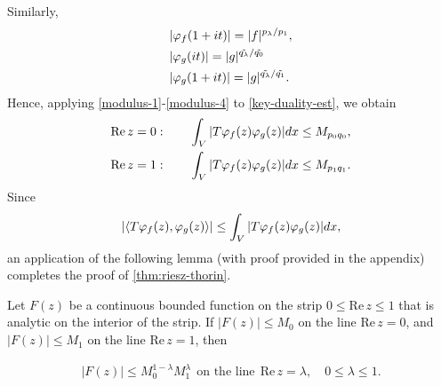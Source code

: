 %
%
Similarly,
%
%
\begin{align}
	\label{modulus-2}
	& | \varphi_f(1 + it) | = | f |^{p_\lambda / p_1},
	\\
	\label{modulus-3}
	& | \varphi_{g}(it) | = | g |^{\tilde{q_\lambda} / \tilde{q_0}}
	\\
	\label{modulus-4}
	& | \varphi_{g}(1 + it) | = | g |^{\tilde{q_\lambda} / \tilde{q_1}}.
\end{align}
%
%
Hence, applying \eqref{modulus-1}-\eqref{modulus-4} to \eqref{key-duality-est},
we obtain
%
%
\begin{equation}
\label{bound-for-apply-3-line-lem}
\begin{split}
	& \text{Re}\,z = 0: \qquad \int_{V} | T \varphi_{f}(z) \varphi_{g}(z) | dx \le M_{p_0
	q_0},
	\\
	& \text{Re}\,z =1: \qquad \int_{V} | T \varphi_{f}(z) \varphi_{g}(z) | dx \le M_{p_1
	q_1}.
\end{split}
\end{equation}
%
%
Since
%
%
\begin{equation*}
\begin{split}
	|\langle T\varphi_{f}(z), \varphi_{g}(z) \rangle | \le \int_{V} | T \varphi_{f}(z)
	\varphi_{g}(z) | dx,
\end{split}
\end{equation*}
%
%
an application of the following lemma (with proof provided in the appendix)
completes the proof of \autoref{thm:riesz-thorin}. \qquad \qedsymbol
%
%
%
%
%
%
\begin{lemma}
\label{lem:three-lines}
Let $F(z)$ be a continuous bounded function on the strip $0 \le \text{Re} \, z \le
1$ that is analytic on the interior of the strip. If $| F(z) | \le M_0$ on the
line $\text{Re}\, z=0$, and $| F(z) | \le M_1$ on the line $\text{Re}\, z=1$, then
\end{lemma}
%
%
%
%
\begin{equation}
\label{three-lines}
\begin{split}
	| F(z) | \le M_{0}^{1-\lambda} M_{1}^{\lambda} \ \ \text{on the line} \ \
	\text{Re}\,z=\lambda, \quad 0 \le \lambda \le 1.
\end{split}
\end{equation}
%
%
%
%
%
%
%
%
%
